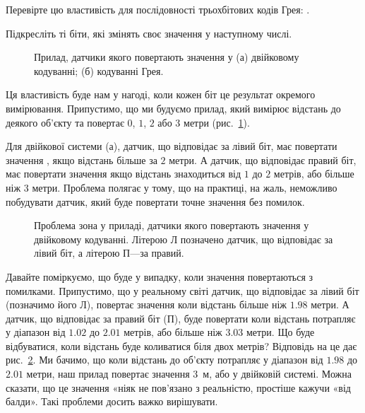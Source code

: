 \begin{exercise}
Перевірте цю властивість для послідовності трьохбітових кодів Грея: .
\par Підкресліть ті біти, які змінять своє значення у наступному числі.
\end{exercise}

\begin{figure}[tb]
  \centering
  
  \caption{Прилад, датчики якого повертають значення у (а) двійковому кодуванні; (б) кодуванні Грея.}
  \label{Pic_Device}
\end{figure}

Ця властивість буде нам у нагоді, коли кожен біт це результат окремого вимірювання.
Припустимо, що ми будуємо прилад, який вимірює відстань до деякого об'єкту та повертає $0$, $1$, $2$ або $3$ метри (рис.~\ref{Pic_Device}).

Для двійкової системи (а), датчик, що відповідає за лівий біт, має повертати значення , якщо відстань більше за $2$ метри.
А датчик, що відповідає правий біт, має повертати значення  якщо відстань знаходиться від $1$ до $2$ метрів, або більше ніж $3$ метри.
Проблема полягає у тому, що на практиці, на жаль, неможливо побудувати датчик, який буде повертати точне значення без помилок.

\begin{figure}[t]
  \centering
  
  \caption{Проблема зона у приладі, датчики якого повертають значення у двійковому кодуванні.
           Літерою Л позначено датчик, що відповідає за лівий біт, а літерою П---за правий.}
  \label{Pic_DeviceError}
\end{figure}

Давайте поміркуємо, що буде у випадку, коли значення повертаються з помилками.
Припустимо, що у реальному світі датчик, що відповідає за лівий біт (позначимо його Л), повертає значення  коли відстань більше ніж $1.98$ метри.
А датчик, що відповідає за правий біт (П), буде повертати  коли відстань потрапляє у діапазон від $1.02$ до $2.01$ метрів, або більше ніж $3.03$ метри.
Що буде відбуватися, коли відстань буде коливатися біля двох метрів?
Відповідь на це дає рис.~\ref{Pic_DeviceError}.
Ми бачимо, що коли відстань до об'єкту потрапляє у діапазон від $1.98$ до $2.01$ метри, наш прилад повертає значення $3$~м, або  у двійковій системі.
Можна сказати, що це значення «ніяк не пов'язано з реальністю, простіше кажучи «від балди».
Такі проблеми досить важко вирішувати.

